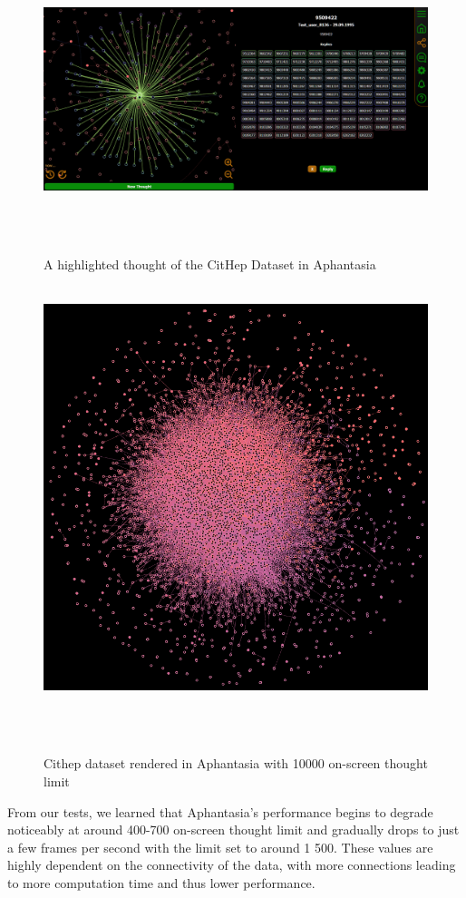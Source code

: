\begin{figure}[p]
    \includegraphics[width=130mm, keepaspectratio]{img/afantazie_cithep_highlighted_thought.png}
    \caption{A highlighted thought of the CitHep Dataset in Aphantasia}
    \label{obr:afantazie_cithep_highlighted_thought}
\end{figure}

\begin{figure}[p]
    \includegraphics[width=130mm, keepaspectratio]{img/afantazie_cithep_10000_on-screen-limit.png}
    \caption{Cithep dataset rendered in Aphantasia with 10000 on-screen thought limit}
    \label{obr:afantazie_cithep_10000_on-screen-limit}
\end{figure}

From our tests, we learned that Aphantasia's performance begins to degrade noticeably at around 400-700 on-screen thought limit
and gradually drops to just a few frames per second with the limit set to around 1 500.
These values are highly dependent on the connectivity of the data, with more connections leading to more computation time and thus lower performance.

